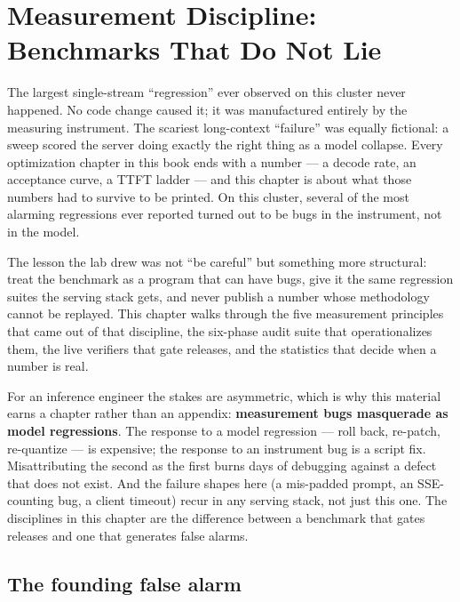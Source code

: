 \chapter{Measurement Discipline: Benchmarks That Do Not Lie}
\label{ch:measurement}

The largest single-stream ``regression'' ever observed on this cluster
never happened. No code change caused it; it was manufactured entirely by
the measuring instrument. The scariest long-context ``failure'' was equally
fictional: a sweep scored the server doing exactly the right thing as a
model collapse. Every optimization chapter in
this book ends with a number --- a decode rate, an acceptance curve, a TTFT
ladder --- and this chapter is about what those numbers had to survive to be
printed. On this cluster, several of the most alarming regressions ever
reported turned out to be bugs in the instrument, not in the model.

The lesson the lab drew was not ``be careful'' but something more
structural: treat the benchmark as a program that can have bugs, give it the
same regression suites the serving stack gets, and never publish a number
whose methodology cannot be replayed. This chapter walks through the five
measurement principles that came out of that discipline, the six-phase audit
suite that operationalizes them, the live verifiers that gate releases, and
the statistics that decide when a number is real.

For an inference engineer the stakes are asymmetric, which is why this
material earns a chapter rather than an appendix: \textbf{measurement bugs
masquerade as model regressions}. The response to a model
regression --- roll back, re-patch, re-quantize --- is expensive; the
response to an instrument bug is a script fix. Misattributing the second as
the first burns days of debugging against a defect that does not exist.
And the failure shapes here (a mis-padded prompt, an SSE-counting bug, a
client timeout) recur in any serving stack, not just this one. The disciplines in
this chapter are the difference between a benchmark that gates releases and
one that generates false alarms.

\section{The founding false alarm}

